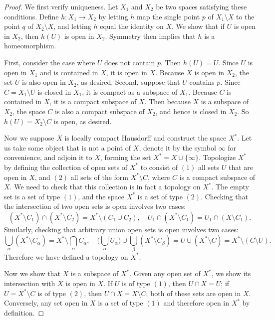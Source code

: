 \begin{proof}
We first verify uniqueness. Let $X_1$ and $X_2$ be two spaces satisfying these conditions. Define $h:X_1\to X_2$ by letting $h$ map the single point $p$ of $X_1\setminus X$ to the point $q$ of $X_2\setminus X$, and letting $h$ equal the identity on $X$. We show that if $U$ is open in $X_2$, then $h(U)$ is open in $X_2$. Symmetry then implies that $h$ is a homeomorphism.\par
First, consider the case where $U$ does not contain $p$. Then $h(U)=U$. Since $U$ is open in $X_1$ and is contained in $X$, it is open in $X$. Because $X$ is open in $X_2$, the set $U$ is also open in $X_2$, as desired. Second, suppose that $U$ contains $p$. Since $C=X_1\setminus U$ is closed in $X_1$, it is compact as a subspace of $X_1$. Because $C$ is contained in $X$, it is a compact subspace of $X$. Then because $X$ is a subspace of $X_2$, the space $C$ is also a compact subspace of $X_2$, and hence is closed in $X_2$. So $h(U)=X_2\setminus C$ is open, as desired.\par
Now we suppose $X$ is locally compact Hausdorff and construct the space $X^*$. Let us take some object that is not a point of $X$, denote it by the symbol $\infty$ for convenience, and adjoin it to $X$, forming the set $X^*=X\cup\{\infty\}$. Topologize $X^*$ by defining the collection of open sets of $X^*$ to consist of $(1)$ all sets $U$ that are open in $X$, and $(2)$ all sets of the form $X^*\setminus C$, where $C$ is a compact subspace of $X$. We need to check that this collection is in fact a topology on $X^*$. The empty set is a set of type $(1)$, and the space $X^*$ is a set of type $(2)$. Checking that the intersection of two open sets is open involves two cases:
\[(X^*\setminus C_1)\cap(X^*\setminus C_2)=X^*\setminus(C_1\cup C_2),\quad U_1\cap(X^*\setminus C_1)=U_1\cap(X\setminus C_1).\]
Similarly, checking that arbitrary union open sets is open involves two cases:
\[\bigcup_\alpha(X^*\setminus C_\alpha)=X^*\setminus\bigcap_\alpha C_\alpha,\quad\Big(\bigcup_\alpha U_\alpha\Big)\cup\bigcup_\beta(X^*\setminus C_\beta)=U\cup(X^*\setminus C)=X^*\setminus(C\setminus U).\]
Therefore we have defined a topology on $X^*$.\par
Now we show that $X$ is a subspace of $X^*$. Given any open set of $X^*$, we show its intersection with $X$ is open in $X$. If $U$ is of type $(1)$, then $U\cap X=U$; if $U=X^*\setminus C$ is of type $(2)$, then $U\cap X=X\setminus C$; both of these sets are open in $X$. Conversely, any set open in $X$ is a set of type $(1)$ and therefore open in $X^*$ by definition.\par

\end{proof}

